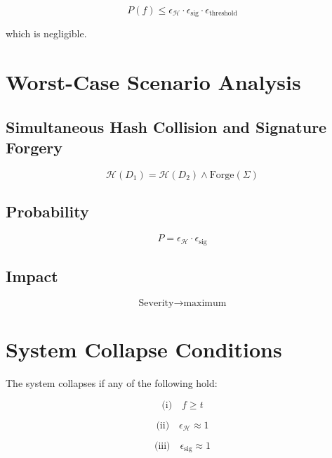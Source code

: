 \begin{equation}
P(f) \leq \epsilon_{\mathcal{H}} \cdot \epsilon_{\text{sig}} \cdot \epsilon_{\text{threshold}}
\end{equation}

which is negligible.

\section{Worst-Case Scenario Analysis}

\subsection{Simultaneous Hash Collision and Signature Forgery}

\begin{equation}
\mathcal{H}(D_1) = \mathcal{H}(D_2) \land \text{Forge}(\Sigma)
\end{equation}

\subsection{Probability}

\begin{equation}
P = \epsilon_{\mathcal{H}} \cdot \epsilon_{\text{sig}}
\end{equation}

\subsection{Impact}

\begin{equation}
\text{Severity} \rightarrow \text{maximum}
\end{equation}

\section{System Collapse Conditions}

The system collapses if any of the following hold:

\begin{equation}
\text{(i)} \quad f \geq t
\end{equation}

\begin{equation}
\text{(ii)} \quad \epsilon_{\mathcal{H}} \approx 1
\end{equation}

\begin{equation}
\text{(iii)} \quad \epsilon_{\text{sig}} \approx 1
\end{equation}

